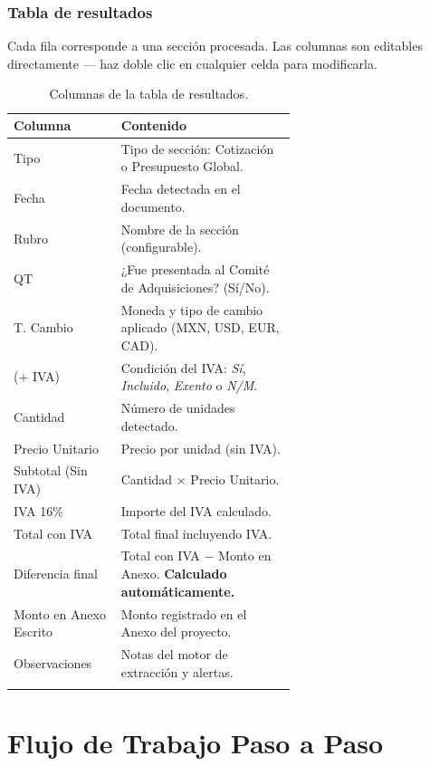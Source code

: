 \documentclass[12pt, a4paper, oneside]{report}
\begin{document}
\subsection{Tabla de resultados}

Cada fila corresponde a una sección procesada. Las columnas son editables
directamente — haz doble clic en cualquier celda para modificarla.

\begin{longtable}{lp{0.62\linewidth}}
  \toprule
  \textbf{Columna} & \textbf{Contenido} \\
  \midrule
  \endhead
  Tipo               & Tipo de sección: Cotización o Presupuesto Global. \\
  Fecha              & Fecha detectada en el documento. \\
  Rubro              & Nombre de la sección (configurable). \\
  QT                 & ¿Fue presentada al Comité de Adquisiciones? (Sí/No). \\
  T. Cambio          & Moneda y tipo de cambio aplicado (MXN, USD, EUR, CAD). \\
  (+ IVA)            & Condición del IVA: \textit{Sí}, \textit{Incluido}, \textit{Exento} o \textit{N/M}. \\
  Cantidad           & Número de unidades detectado. \\
  Precio Unitario    & Precio por unidad (sin IVA). \\
  Subtotal (Sin IVA) & Cantidad × Precio Unitario. \\
  IVA 16\%           & Importe del IVA calculado. \\
  Total con IVA      & Total final incluyendo IVA. \\
  Diferencia final   & Total con IVA $-$ Monto en Anexo. \textbf{Calculado automáticamente.} \\
  Monto en Anexo Escrito & Monto registrado en el Anexo del proyecto. \\
  Observaciones      & Notas del motor de extracción y alertas. \\
  \bottomrule
  \caption{Columnas de la tabla de resultados.}
\end{longtable}

\chapter{Flujo de Trabajo Paso a Paso}
\end{document}
